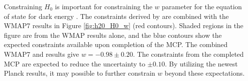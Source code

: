 Constraining $H_0$ is important for constraining the $w$ parameter for the equation of state for dark energy \citep{reid2013_mmproject_IV}. The constraints derived by \citet{reid2013_mmproject_IV} are combined with the WMAP7 results in Figure \ref{fig:h20_H0_w} (red contours). Shaded regions in the figure are from the WMAP results alone, and the blue contours show the expected constraints available upon completion of the MCP. The combined WMAP7 and \citet{reid2013_mmproject_IV} results give $w=-0.98\pm0.20$. The constraints from the completed MCP are expected to reduce the uncertainty to $\pm0.10$. By utilizing the newest Planck results, it may possible to further constrain $w$ beyond these expectations.

